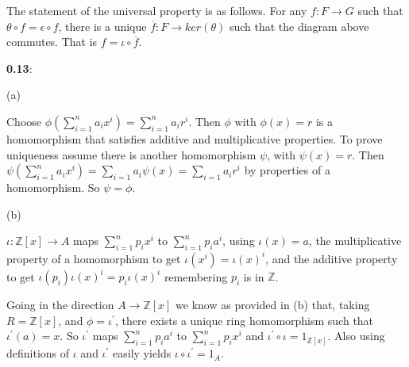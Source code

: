 \documentclass{article}
\begin{document}
The statement of the universal property is as follows. For any $f: F \rightarrow G$ such that $\theta \circ f = \epsilon \circ f$, there is a unique $\overline{f}: F \rightarrow ker(\theta)$ such that the diagram above commutes. That is $f = \iota \circ \overline{f}$.

\textbf{0.13}:

(a)

Choose $\phi(\sum_{i=1}^na_ix^i) = \sum_{i=1}^na_ir^i$. Then $\phi$ with $\phi(x)=r$ is a homomorphism that
satisfies additive and multiplicative properties. To prove uniqueness assume there is another
homomorphism $\psi$, with $\psi(x)=r$. Then $\psi(\sum_{i=1}^na_ix^i) = \sum_{i=1}a_i\psi(x) = \sum_{i=1}a_ir^i$ by properties of
a homomorphism. So $\psi=\phi$. \par


(b)

$\iota \colon \mathds{Z}[x] \rightarrow A$ maps
$\sum_{i=1}^n p_ix^i$ to $\sum_{i=1}^n p_ia^i$, using $\iota(x) = a$,
the multiplicative property of a homomorphism to get $\iota(x^i)=\iota(x)^i$,
and the additive property to get $\iota(p_i)\iota(x)^i = p_i\iota(x)^i$ remembering $p_i$ is in $\mathds{Z}$. \par

Going in the direction $A \rightarrow \mathds{Z}[x]$ we know as provided in (b) that,
taking $R=\mathds{Z}[x]$, and $\phi=\iota^\prime$, there exists a unique ring homomorphism such that $\iota^\prime(a)=x$.
So $\iota^\prime $ maps $\sum_{i=1}^np_ia^i$ to $\sum_{i=1}^{n}p_ix^i$ and $\iota^\prime \circ \iota = 1_{\mathds{Z}[x]}$.
Also using definitions of $\iota$ and $\iota^\prime$ easily yields $\iota \circ \iota^\prime = 1_A$.
\end{document}
